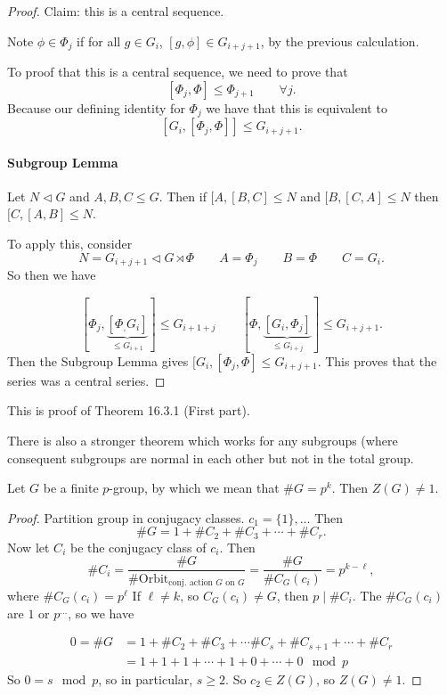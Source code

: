 \begin{proof}
Claim: this is a central sequence.

Note $\phi \in \Phi_j$ if for all $g \in G_i$, $[g, \phi] \in G_{i+j + 1}$, by the previous calculation.


To proof that this is a central sequence, we need to prove that
\[
    [\Phi_{j}, \Phi] \le  \Phi_{j+1} \qquad \forall j
.\] 
Because our defining identity for $\Phi_j$ we have that this is equivalent to
 \[
     [G_i, [\Phi_j, \Phi]] \le  G_{i+j+1}
.\] 


\paragraph{Subgroup Lemma}
Let $N \triangleleft G$ and $A, B, C \le G$.
Then if $[A, [B, C] \le N$ and $[B, [C, A] \le  N$ then $[C, [A, B] \le N$.

To apply this, consider
\[
N = G_{i+j+1} \triangleleft G \rtimes \Phi \qquad A = \Phi_j \qquad B = \Phi \qquad C = G_i
.\] 
So then we have

\[
    [\Phi_j, \underbrace{[\Phi_, G_i]}_{\le G_{i+1}}] \le G_{i+1+j}
    \qquad
    [\Phi, \underbrace{[G_i, \Phi_j]}_{\le G_{i+j}}] \le  G_{i+j+1}
.\] 
Then the Subgroup Lemma gives $[G_i, [\Phi_j, \Phi] \le  G_{i+j+1}$.
This proves that the series was a central series.

\end{proof}

\begin{remark}
    This is proof of Theorem 16.3.1 (First part).

    There is also a stronger theorem which works for any subgroups (where consequent subgroups are normal in each other but not in the total group.
\end{remark}


\begin{prop}
    Let $G$ be a finite $p$-group, by which we mean that $\# G = p^{k}$.
    Then $Z(G) \neq 1$.
\end{prop}
\begin{proof}
    Partition group in conjugacy classes. $ c_1 = \{1\}, \ldots$
    Then
    \[
    \# G = 1 + \# C_2 + \# C_3 + \cdots + \# C_r
    .\] 
    Now let $C_i$ be the conjugacy class of $c_i$.
    Then
    \[
        \# C_i =
        \frac{\# G}{\# \text{Orbit}_{\text{conj. action $G$ on  $G$}}} = 
        \frac{\# G}{\# C_G(c_i)} = p^{k-\ell}
    ,\] 
    where $\# C_G(c_i) = p^{\ell}$
    If $ \ell \neq k$, so $C_G(c_i) \neq G$, then  $p  \mid  \# C_i$.
    The $\#C_G(c_i)$ are  $1$ or $p^{\ldots}$, so we have

    \begin{align*}
        0 = \# G &=
        1 + \# C_2 + \# C_3 + \cdots \# C_s + \#C_{s+1} + \cdots + \# C_r\\
                 & =1  + 1 + 1 + \cdots + 1 + 0 + \cdots + 0
        \mod p
    \end{align*}
    So $0 = s \mod p$, so in particular,  $s \ge  2$.
    So $c_2 \in Z(G)$, so $Z(G) \neq 1$.
\end{proof}

